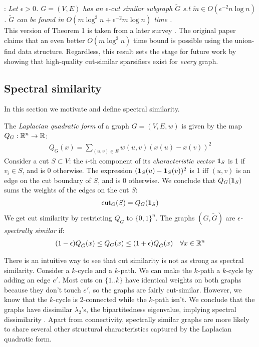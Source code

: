 \documentclass{article}
\begin{document}
\noindent
{}: \textit{Let $\epsilon > 0$. $G =
(V, E)$ has an $\epsilon$-cut similar subgraph $\tilde{G}$ s.t $\tilde{m}
\in O(\epsilon^{-2}n\log n)$. $\tilde{G}$ can be found in $O(m\log^3n +
\epsilon^{-2}m\log n)$ time \cite{BenczurKarger}.} \\

This version of Theorem 1 is taken from a later survey \cite{TheSurvey}. The
original paper claims that an even better $O(m\log^2 n)$ time bound is
possible using the union-find data structure. Regardless, this result sets
the stage for future work by showing that high-quality cut-similar
sparsifiers exist for \textit{every} graph. 

\subsection{Spectral similarity}

In this section we motivate and define spectral similarity.

The \textit{Laplacian quadratic form} of a graph $G = (V, E, w)$ is given by
the map $Q_G : \mathbb{R}^n \rightarrow \mathbb{R}$:
\begin{align*}
    Q_G(x) = \sum_{(u, v) \in E} w(u, v)(x(u) - x(v))^2
\end{align*}
Consider a cut $S \subset V$: the $i$-th component of its
\textit{characteristic vector} $\mathbf{1}_S$ is 1 if $v_i \in S$, and is 0
otherwise. The expression $(\mathbf{1}_S(u) - \mathbf{1}_S(v))^2$ is 1 iff $(u, v)$ is
an edge on the cut boundary of $S$, and is 0 otherwise. We conclude that
$Q_G(\mathbf{1}_S)$ sums the weights of the edges on the cut $S$:
\begin{align*}
    \text{cut}_{G}(S) = Q_G(\mathbf{1}_S)
\end{align*}
We get cut similarity by restricting $Q_G$ to $\{0, 1\}^n$. The graphs $(G,
\tilde{G})$ are \textit{$\epsilon$-spectrally similar} if:
\begin{align*}
    (1 - \epsilon)Q_{\tilde{G}}(x) \leq Q_G(x) \leq (1 +
    \epsilon)Q_{\tilde{G}}(x) \quad \forall{x \in \mathbb{R}^n}
\end{align*}

There is an intuitive way to see that cut similarity is not as strong as
spectral similarity. Consider a $k$-cycle and a $k$-path. We can make the
$k$-path a $k$-cycle by adding an edge $e'$. Most cuts on $\{1..k\}$ have
identical weights on both graphs because they don't touch $e'$, so the
graphs are fairly cut-similar. However, we know that the $k$-cycle is
2-connected while the $k$-path isn't. We conclude that the graphs have
dissimilar $\lambda_2$'s, the bipartitedness eigenvalue, implying spectral
dissimilarity \cite{Fiedler}. Apart from connectivity, spectrally similar
graphs are more likely to share several other structural characteristics
captured by the Laplacian quadratic form.
\end{document}
